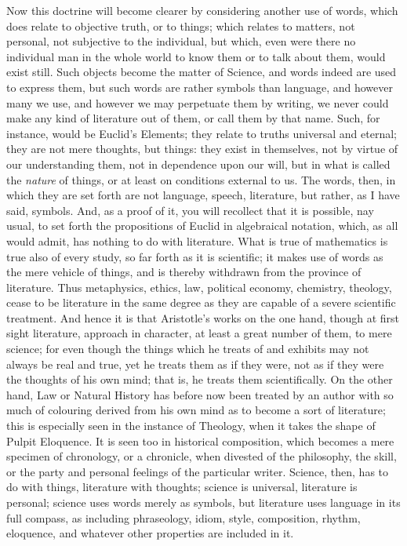 Now this doctrine will become clearer by considering another use of
words, which does relate to objective truth, or to things; which
relates to matters, not personal, not subjective to the individual,
but which, even were there no individual man in the whole world to
know them or to talk about them, would exist still. Such objects
become the matter of Science, and words indeed are used to express
them, but such words are rather symbols than language, and however
many we use, and however we may perpetuate them by writing, we never
could make any kind of literature out of them, or call them by that
name. Such, for instance, would be Euclid's Elements; they relate to
truths universal and eternal; they are not mere thoughts, but things:
they exist in themselves, not by virtue of our understanding them, not
in dependence upon our will, but in what is called the \emph{nature}
of things, or at least on conditions external to us. The words, then,
in which they are set forth are not language, speech, literature, but
rather, as I have said, symbols. And, as a proof of it, you will
recollect that it is possible, nay usual, to set forth the
propositions of Euclid in algebraical notation, which, as all would
admit, has nothing to do with literature. What is true of mathematics
is true also of every study, so far forth as it is scientific; it
makes use of words as the mere vehicle of things, and is thereby
withdrawn from the province of literature. Thus metaphysics, ethics,
law, political economy, chemistry, theology, cease to be literature in
the same degree as they are capable of a severe scientific treatment.
And hence it is that Aristotle's works on the one hand, though
at first sight literature, approach in character, at least a great
number of them, to mere science; for even though the things which he
treats of and exhibits may not always be real and true, yet he treats
them as if they were, not as if they were the thoughts of his own
mind; that is, he treats them scientifically. On the other hand, Law
or Natural History has before now been treated by an author with so
much of colouring derived from his own mind as to become a sort of
literature; this is especially seen in the instance of Theology, when
it takes the shape of Pulpit Eloquence. It is seen too in historical
composition, which becomes a mere specimen of chronology, or a
chronicle, when divested of the philosophy, the skill, or the party
and personal feelings of the particular writer. Science, then, has to
do with things, literature with thoughts; science is universal,
literature is personal; science uses words merely as symbols, but
literature uses language in its full compass, as including
phraseology, idiom, style, composition, rhythm, eloquence, and
whatever other properties are included in it.

